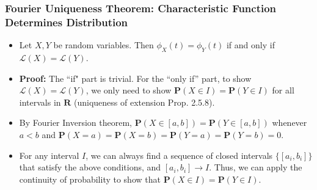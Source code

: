\documentclass[handout]{beamer}
\newcommand{\BP}{\mathbf{P}}
\begin{document}
\frame
{
  \frametitle{Fourier Uniqueness Theorem: Characteristic Function Determines Distribution} 

 \begin{itemize}
 
  \item<1->[] \begin{Theorem} Let $X, Y$ be random variables. Then $\phi_X(t)=\phi_Y(t)$ if and only if $\mathcal{L}(X)=\mathcal{L} (Y)$.   
   \end{Theorem}
  
  \item<2->\textbf{Proof:} The ``if" part is trivial. For the ``only if'' part, to show $\mathcal{L}(X)=\mathcal{L} (Y)$, we only need to show $\BP(X\in I)=\BP(Y\in I)$ for all intervals in $\mathbf{R}$ (uniqueness of extension Prop. 2.5.8). 
  
  \item<3->[-] By Fourier Inversion theorem, $\BP(X\in [a,b])=\BP(Y\in [a,b])$ whenever $a<b$ and $\BP(X=a)=\BP(X=b)=\BP(Y=a)=\BP(Y=b)=0$. 
  \item<4->[-] For any interval $I$, we can always find a sequence of closed intervals $\{[a_i, b_i]\}$ that satisfy the above conditions, and $[a_i,b_i]\rightarrow I$. Thus, we can apply the continuity of probability to show that $\BP(X\in I)=\BP(Y\in I)$.
  
  \end{itemize}
}
\end{document}
